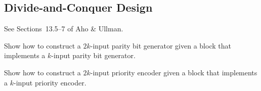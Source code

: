 \subsection{Divide-and-Conquer Design}
See Sections~13.5--7 of Aho \& Ullman.
\begin{exercises}
\problem Show how to construct a $2k$-input parity bit generator given a block that implements a $k$-input parity bit generator.

\problem Show how to construct a $2k$-input priority encoder given a block that implements a $k$-input priority encoder.
\end{exercises}


